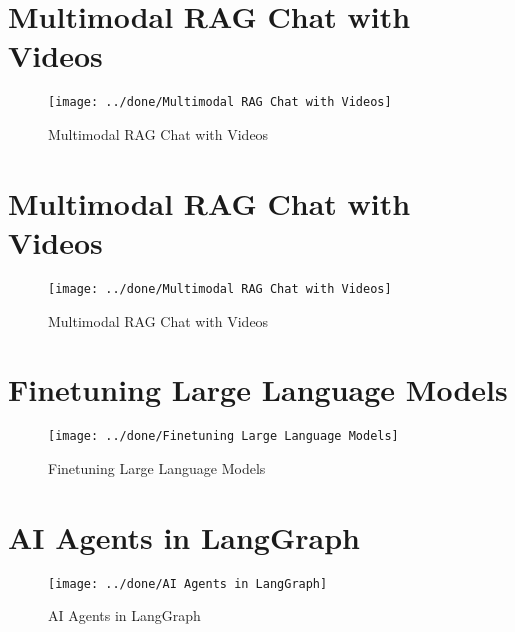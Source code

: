 \documentclass[a4paper,12pt]{article}
\begin{document}
\section*{Multimodal RAG Chat with Videos}
\begin{figure}[h]
	\centering
	\vspace{-10pt} %
	\texttt{[image: ../done/Multimodal RAG Chat  with Videos]}
	\vspace{-10pt} %
	\caption{Multimodal RAG Chat with Videos}
	\vspace{-10pt} %
\end{figure}


\section*{Multimodal RAG Chat with Videos}
\begin{figure}[h]
	\centering
	\vspace{-10pt} %
	\texttt{[image: ../done/Multimodal RAG Chat with Videos]}
	\vspace{-10pt} %
	\caption{Multimodal RAG Chat with Videos}
	\vspace{-10pt} %
\end{figure}
\newpage
\section*{Finetuning Large Language Models}
\begin{figure}[h]
	\centering
	\vspace{-10pt} %
	\texttt{[image: ../done/Finetuning Large Language Models]}
	\vspace{-10pt} %
	\caption{Finetuning Large Language Models}
	\vspace{-10pt} %
\end{figure}


\section*{AI Agents in LangGraph}
\begin{figure}[h]
	\centering
	\vspace{-10pt} %
	\texttt{[image: ../done/AI Agents in LangGraph]}
	\vspace{-10pt} %
	\caption{AI Agents in LangGraph}
	\vspace{-10pt} %
\end{figure}
\newpage
\end{document}
